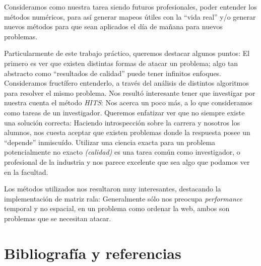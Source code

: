 Consideramos como nuestra tarea siendo futuros profesionales, poder entender los métodos numéricos, para así generar mapeos útiles con la ``vida real'' y/o generar nuevos métodos para que sean aplicados el día de mañana para nuevos problemas.

Particularmente de este trabajo práctico, queremos destacar algunos puntos: El primero es ver que existen distintas formas de atacar un problema; algo tan abstracto como  ``resultados de calidad'' puede tener infinitos enfoques. Consideramos fructífero entenderlo, a través del análisis de distintos algoritmos para resolver el mismo problema. Nos resultó interesante tener que investigar por nuestra cuenta el método \textit{HITS}: Nos acerca un poco más, a lo que consideramos como tareas de un investigador. Queremos enfatizar ver que no siempre existe una solución correcta: Haciendo introspección sobre la carrera y nosotros los alumnos, nos cuesta aceptar que existen problemas donde la respuesta posee un ``depende'' inmiscuído. Utilizar una ciencia exacta para un problema potencialmente no exacto \textit{(calidad)} es una tarea común como investigador, o profesional de la industria y nos parece excelente que sea algo que podamos ver en la facultad.

Los métodos utilizados nos resultaron muy interesantes, destacando la implementación de matriz rala: Generalmente sólo nos preocupa \textit{performance} temporal y no espacial, en un problema como ordenar la web, ambos son problemas que se necesitan atacar. 

\section{Bibliografía y referencias} %

